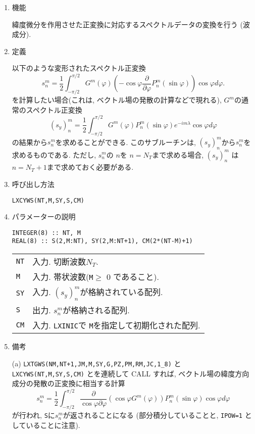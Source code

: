 \documentclass[a4j]{jarticle}
\begin{document}
\begin{enumerate}

\item 機能

  緯度微分を作用させた正変換に対応するスペクトルデータの変換を行う
  (波成分).
  
\item 定義

以下のような変形されたスペクトル正変換
\begin{equation}
s^m_n=\frac1{2}\int^{\pi/2}_{-\pi/2}
G^m(\varphi)
\left(-\cos\varphi\frac{\partial}{\partial\varphi}P^m_n(\sin\varphi)\right)
\cos\varphi d\varphi.
\end{equation}
を計算したい場合(これは, ベクトル場の発散の計算などで現れる), 
$G^m$の通常のスペクトル正変換
\begin{equation}
(s_y)^m_n=\frac1{2}\int^{\pi/2}_{-\pi/2}
G^m(\varphi)
P^m_n(\sin\varphi)
e^{-im\lambda}\cos\varphi d\varphi
\end{equation}
の結果から$s^m_n$を求めることができる. 
このサブルーチンは, $(s_y)^m_n$から$s^m_n$を求めるものである.
ただし, $s^m_n$の $n$を $n=N_T$まで求める場合, $(s_y)^m_n$
は $n=N_T+1$まで求めておく必要がある.

\item 呼び出し方法 
    
\texttt{LXCYWS(NT,M,SY,S,CM)}
  
\item パラメーターの説明

\begin{verbatim}
INTEGER(8) :: NT, M
REAL(8) :: S(2,M:NT), SY(2,M:NT+1), CM(2*(NT-M)+1)
\end{verbatim}
      
\begin{tabular}{ll}
\texttt{NT} & 入力. 切断波数$N_T$.\\
\texttt{M} & 入力. 帯状波数(\texttt{M}$\ge$ 0 であること).\\
\texttt{SY} & 入力. $(s_y)^m_n$が格納されている配列.\\
\texttt{S} & 出力. $s^m_n$が格納される配列.\\
\texttt{CM}  & 入力. \texttt{LXINIC}で \texttt{M}を指定して初期化された配列.
\end{tabular}

\item 備考

(a) \texttt{LXTGWS(NM,NT+1,JM,M,SY,G,PZ,PM,RM,JC,1\_8)} と
    \texttt{LXCYWS(NT,M,SY,S,CM)}
    とを連続して CALL すれば, 
    ベクトル場の緯度方向成分の発散の正変換に相当する計算
\begin{equation}
s^m_n=\frac1{2}\int^{\pi/2}_{-\pi/2}
\frac{\partial}{\cos\varphi\partial\varphi}
\left(\cos\varphi G^m(\varphi)\right)
P^m_n(\sin\varphi)\cos\varphi d\varphi
\end{equation}
が行われ, \texttt{S}に$s^m_n$が返されることになる
(部分積分していることと, \texttt{IPOW=1} としていることに注意).
  
\end{enumerate}
\end{document}
